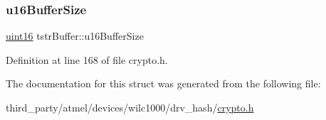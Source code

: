 \subsubsection{\texorpdfstring{u16\+Buffer\+Size}{u16BufferSize}}
{\footnotesize\ttfamily \hyperlink{group__DataT_ga1daa745171fc6e31d942c161422a76f9}{uint16} tstr\+Buffer\+::u16\+Buffer\+Size}



Definition at line 168 of file crypto.\+h.



The documentation for this struct was generated from the following file\+:\begin{DoxyCompactItemize}
\item 
third\+\_\+party/atmel/devices/wilc1000/drv\+\_\+hash/\hyperlink{third__party_2atmel_2devices_2wilc1000_2drv__hash_2crypto_8h}{crypto.\+h}\end{DoxyCompactItemize}
